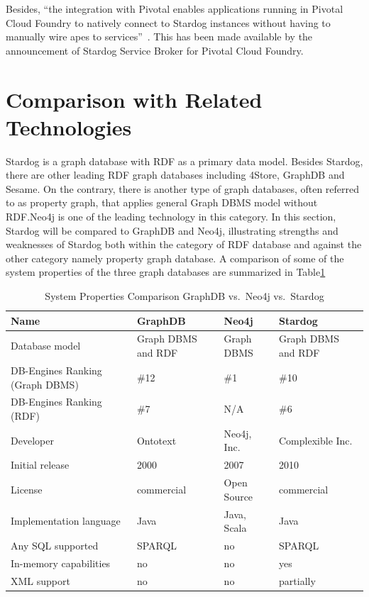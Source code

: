 Besides, ``the integration with Pivotal enables applications running in Pivotal 
Cloud Foundry to natively connect to Stardog instances without having to 
manually wire apes to services''~\cite{hid-sp18-405-blog-stardog-pcf}. This 
has been made available by the announcement of Stardog Service Broker for 
Pivotal Cloud Foundry.

\section{Comparison with Related Technologies}
Stardog is a graph database with RDF as a primary data model. Besides 
Stardog, there are other leading RDF graph databases including 4Store, 
GraphDB and Sesame. On the contrary, there is another type of graph 
databases, often referred to as property graph, that applies general Graph 
DBMS model without RDF.\@ Neo4j is one of the leading technology in this 
category. In this section, Stardog will be compared to GraphDB and Neo4j, 
illustrating strengths and weaknesses of Stardog both within the category of 
RDF database and against the other category namely property graph 
database. A comparison of some of the system properties of the three graph 
databases are summarized in 
Table\ref{t:comparison}~\cite{hid-sp18-405-www-stardog-dbengines-neo4j}~\cite{hid-sp18-405-www-stardog-dbengines-graphdb}

\begin{table}[htb]
	\centering
	\caption{System Properties Comparison GraphDB vs.\ Neo4j vs.\ 
	Stardog}\label{t:comparison}
	\begin{tabular}{llll}
	Name & GraphDB & Neo4j & Stardog \\
		\toprule
	Database model&	Graph DBMS and RDF & Graph DBMS & Graph DBMS and 
	RDF \\
	\midrule
	DB-Engines Ranking (Graph DBMS) &\#12 &\#1 &\#10\\
	\midrule
	DB-Engines Ranking (RDF) &\#7 &N/A &\#6\\
	\midrule
	Developer & Ontotext &	Neo4j, Inc.	& Complexible Inc.\\
	\midrule
	Initial release	&2000 &	2007&	2010\\
	\midrule
	License &	commercial &	Open Source &	commercial \\
	\midrule
	Implementation language &	Java &	Java, Scala &	Java\\
	\midrule
	Any SQL supported &	SPARQL &	no	& SPARQL \\
	\midrule
	In-memory capabilities&no &no &			yes\\
	\midrule
	XML support&	no	& no& 	partially\\
	\bottomrule
	\end{tabular}
\end{table}

